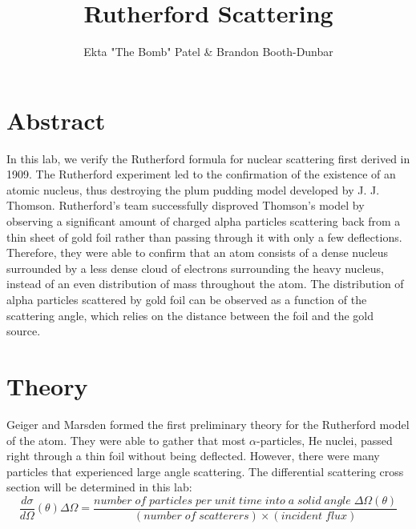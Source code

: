
\newcommand{\ig}[2][width=4in]{\texttt{[image: \#2]}}    		
\usepackage{graphicx}					
\usepackage{amssymb}
\usepackage{pgfplotstable}
\usepackage{float}
\usepackage{caption}
\captionsetup[table]{justification=justified,singlelinecheck=false, position=bottom}


\header {\today}							
\title{Rutherford Scattering}
\author{Ekta "The Bomb" Patel \& Brandon Booth-Dunbar}

\section{Abstract}
\begin{em} In this lab, we verify the Rutherford formula for nuclear scattering first derived in 1909. The Rutherford experiment led to the confirmation of the existence of an atomic nucleus, thus destroying the plum pudding model  developed by J. J. Thomson. Rutherford's team successfully disproved Thomson's model by observing a significant amount of charged alpha particles scattering back from a thin sheet of gold foil rather than passing through it with only a few deflections. Therefore, they were able to confirm that an atom consists of a dense nucleus surrounded by a less dense cloud of electrons surrounding the heavy nucleus, instead of an even distribution of mass throughout the atom. The distribution of alpha particles scattered by gold foil can be observed as a function of the scattering angle, which relies on the distance between the foil and the gold source. \end {em}

\section{Theory}
Geiger and Marsden formed the first preliminary theory for the Rutherford model of the atom. They were able to gather that most $\alpha$-particles, He nuclei, passed right through a thin foil without being deflected. However, there were many particles that experienced large angle scattering. The differential scattering cross section will be determined in this lab: 
\begin{equation} \frac{d\sigma}{d\Omega}(\theta)\Delta\Omega=\frac{number\;of\; particles\; per\; unit\; time\;into\;a \;solid\; angle\; \Delta\Omega(\theta)}{(number \;of\; scatterers)\times (incident\; flux)} \end{equation}

